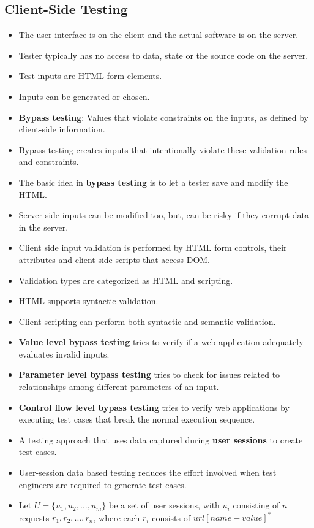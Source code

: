 \documentclass[a4paper]{article}
\begin{document}
\subsection{Client-Side Testing}
\begin{itemize}
    \item The user interface is on the client and the actual software is on the server.
    \item Tester typically has no access to data, state or the source code on the server.
    \item Test inputs are HTML form elements.
    \item Inputs can be generated or chosen.
    \item \textbf{Bypass testing}: Values that violate constraints on the inputs, as defined by client-side information.
    \item Bypass testing creates inputs that intentionally violate these validation rules and constraints.
    \item The basic idea in \textbf{bypass testing} is to let a tester save and modify the HTML.
    \item Server side inputs can be modified too, but, can be risky if they corrupt data in the server.
    \item Client side input validation is performed by HTML form controls, their attributes and client side scripts that access DOM.
    \item Validation types are categorized as HTML and scripting.
    \item HTML supports syntactic validation.
    \item Client scripting can perform both syntactic and semantic validation.
    \item \textbf{Value level bypass testing} tries to verify if a web application adequately evaluates invalid inputs.
    \item \textbf{Parameter level bypass testing} tries to check for issues related to relationships among different parameters of an input.
    \item \textbf{Control flow level bypass testing} tries to verify web applications by executing test cases that break the normal execution sequence.
    \item A testing approach that uses data captured during \textbf{user sessions} to create test cases.
    \item User-session data based testing reduces the effort involved when test engineers are required to generate test cases.
    \item Let $U=\{u_1,u_2,...,u_m\}$ be a set of user sessions, with $u_i$ consisting of $n$ requests $r_1,r_2,...,r_n$, where each $r_i$ consists of $url[name-value]^*$

\end{itemize}
\end{document}
